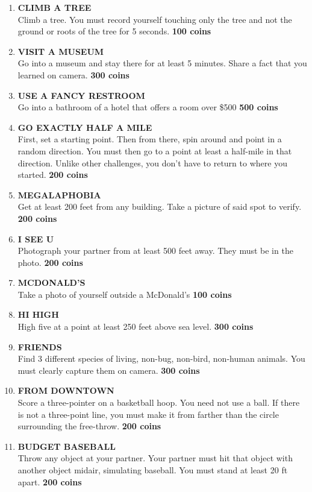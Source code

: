 \documentclass{article}
\begin{document}
\begin{enumerate}
    \item \textbf{CLIMB A TREE} \\ Climb a tree. You must record yourself touching only the tree and not the ground or roots of the tree for 5 seconds. \textbf{100 coins}
    \item \textbf{VISIT A MUSEUM} \\ Go into a museum and stay there for at least 5 minutes. Share a fact that you learned on camera. \textbf{300 coins}
    \item \textbf{USE A FANCY RESTROOM} \\ Go into a bathroom of a hotel that offers a room over \$500 \textbf{500 coins}
    \item \textbf{GO EXACTLY HALF A MILE} \\ First, set a starting point. Then from there, spin around and point in a random direction. You must then go to a point at least a half-mile in that direction. Unlike other challenges, you don't have to return to where you started. \textbf{200 coins}
    \item \textbf{MEGALAPHOBIA} \\ Get at least 200 feet from any building. Take a picture of said spot to verify. \textbf{200 coins}
    \item \textbf{I SEE U}
    \\ Photograph your partner from at least 500 feet away. They must be in the photo. \textbf{200 coins}
    \item \textbf{MCDONALD'S}
    \\ Take a photo of yourself outside a McDonald's \textbf{100 coins}
    \item \textbf{HI HIGH}
    \\ High five at a point at least 250 feet above sea level. \textbf{300 coins}
    \item \textbf{FRIENDS}
    \\ Find 3 different species of living, non-bug, non-bird, non-human animals. You must clearly capture them on camera. \textbf{300 coins}
    \item \textbf{FROM DOWNTOWN} \\ Score a three-pointer on a basketball hoop. You need not use a ball. If there is not a three-point line, you must make it from farther than the circle surrounding the free-throw. \textbf{200 coins}
    \item \textbf{BUDGET BASEBALL} \\ Throw any object at your partner. Your partner must hit that object with another object midair, simulating baseball. You must stand at least 20 ft apart. \textbf{200 coins}

\end{enumerate}
\end{document}
